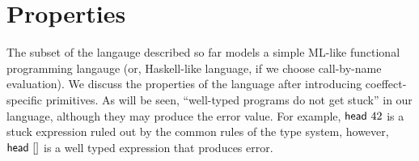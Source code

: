 \documentclass[
		twoside,openright,titlepage,numbers=noenddot,headinclude,%
                footinclude=true,cleardoublepage=empty,
                BCOR=10mm,paper=a4,fontsize=10pt, %
                ngerman,american, %
                ]{scrreprt}
\newcommand{\sep}[0]{\; | \;}
\newcommand{\ident}[1]{\textnormal{\sffamily #1}}
\newcommand{\aclrd}[1]{\textcolor{aclr}{#1}}
\newcommand{\cclrd}[1]{\textcolor{cclr}{#1}}
\newcommand{\cunit}{ \textcolor{cclr}{ \mathsf{use} } }
\begin{document}

\section{Properties}

The subset of the langauge described so far models a simple ML-like functional programming 
langauge (or, Haskell-like language, if we choose call-by-name evaluation). We discuss the properties
of the language after introducing coeffect-specific primitives. As will be seen, ``well-typed
programs do not get stuck'' in our language, although they may produce the \ident{error} value.
For example, $\ident{head}~42$ is a stuck expression ruled out by the common rules of the type
system, however, $\ident{head}~[]$ is a well typed expression that produces \ident{error}.







%
\end{document}
